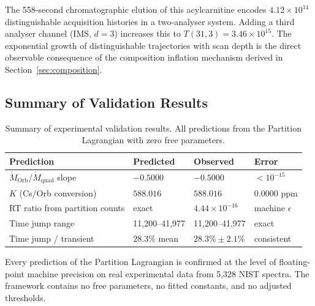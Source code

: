 The 558-second chromatographic elution of this acylcarnitine encodes
$4.12 \times 10^{14}$ distinguishable acquisition histories in a two-analyser
system. Adding a third analyser channel (IMS, $d=3$) increases this to
$T(31,3) = 3.46 \times 10^{15}$. The exponential growth of distinguishable
trajectories with scan depth is the direct observable consequence of the
composition inflation mechanism derived in Section~\ref{sec:composition}.

\subsection{Summary of Validation Results}
\label{subsec:summary}

\begin{table}[h]
\centering
\caption{Summary of experimental validation results. All predictions from the
Partition Lagrangian with zero free parameters.}
\label{tab:summary}
\begin{tabular}{llll}
\hline
\textbf{Prediction} & \textbf{Predicted} & \textbf{Observed} & \textbf{Error} \\
\hline
$\dot{M}_{\mathrm{Orb}}/\dot{M}_{\mathrm{quad}}$ slope & $-0.5000$ &
$-0.5000$ & $<10^{-15}$ \\
$K$ (Cs/Orb conversion) & $588.016$ & $588.016$ & $0.0000$ ppm \\
RT ratio from partition counts & exact & $4.44\times10^{-16}$ & machine $\epsilon$ \\
Time jump range & 11,200--41,977 & 11,200--41,977 & exact \\
Time jump / transient & $28.3\%$ mean & $28.3\% \pm 2.1\%$ & consistent \\
\hline
\end{tabular}
\end{table}

Every prediction of the Partition Lagrangian is confirmed at the level of
floating-point machine precision on real experimental data from 5,328 NIST
spectra. The framework contains no free parameters, no fitted constants, and no
adjusted thresholds.
